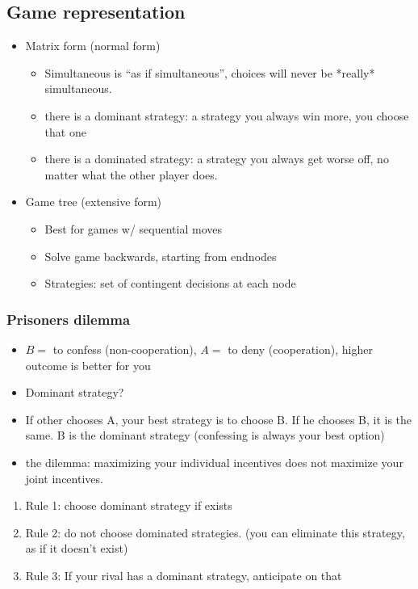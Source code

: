 \documentclass[12pt, a4paper, titlepage]{extarticle}
\begin{document}
\begin{itemize}
\begin{itemize}
        \end{itemize}
    \end{itemize}
    \subsection{Game representation}
    \begin{itemize}
        \item Matrix form (normal form)
        \begin{itemize}
            \item  Simultaneous is ``as if simultaneous'', choices will never be *really* simultaneous.
            \item there is a dominant strategy: a strategy you always win more, you choose that one
            \item there is a dominated strategy: a strategy you always get worse off, no matter what the other player does.
        \end{itemize}
        \item Game tree (extensive form)
        \begin{itemize}
            \item Best for games w/ sequential moves
            \item Solve game backwards, starting from endnodes
            \item Strategies: set of contingent decisions at each node
        \end{itemize}
    \end{itemize}

    \subsubsection{Prisoners dilemma}
    \begin{itemize}
        \item $B =$ to confess (non-cooperation), $A =$ to deny (cooperation), higher outcome is better for you
        \item Dominant strategy?
        \item If other chooses A, your best strategy is to choose B. If he chooses B, it is the same. B is the dominant strategy (confessing is always your best option)
        \item the dilemma: maximizing your individual incentives does not maximize your joint incentives.
    \end{itemize}
    \begin{enumerate}
        \item Rule 1: choose dominant strategy if exists
        \item Rule 2: do not choose dominated strategies. (you can eliminate this strategy, as if it doesn't exist)
        \item Rule 3: If your rival has a dominant strategy, anticipate on that
    \end{enumerate}
    
\end{document}
